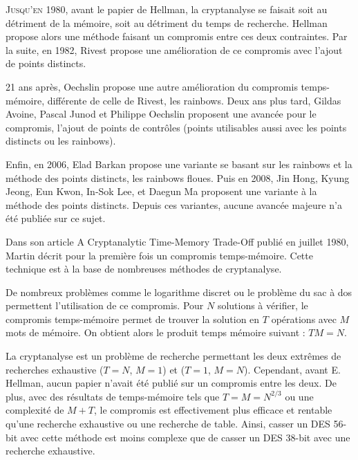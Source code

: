 

		\lettrine{J}{usqu'en 1980}, avant le papier de Hellman\cite{ehellman}, la cryptanalyse se faisait soit au détriment de la mémoire, soit au détriment du temps de recherche. Hellman propose alors une méthode faisant un compromis entre ces deux contraintes. Par la suite, en 1982, Rivest\cite{Rivest} propose une amélioration de ce compromis avec l'ajout de points distincts.

		\bigskip

		21 ans après, Oechslin\cite{Oech03} propose une autre amélioration du compromis temps-mémoire, différente de celle de Rivest, les \glspl{rainbow}. Deux ans plus tard, Gildas Avoine, Pascal Junod et Philippe Oechslin\cite{checkpoints} proposent une avancée pour le compromis, l'ajout de points de contrôles (points utilisables aussi avec les points distincts ou les \glspl{rainbow}).

		\bigskip

		Enfin, en 2006, Elad Barkan propose une variante se basant sur les \glspl{rainbow} et la méthode des points distincts\cite{fuzzy}, les \glspl{rainbow} floues. Puis en 2008, Jin Hong, Kyung Jeong, Eun Kwon, In-Sok Lee, et Daegun Ma proposent une variante à la méthode des points distincts. Depuis ces variantes, aucune avancée majeure n'a été publiée sur ce sujet.


		Dans son article \og{}A Cryptanalytic Time-Memory Trade-Off\fg{}\cite{ehellman} publié en juillet 1980, Martin  décrit pour la première fois un compromis temps-mémoire. Cette technique est à la base de nombreuses méthodes de cryptanalyse.

		\bigskip

		De nombreux problèmes comme le logarithme discret ou le problème du sac à dos permettent l'utilisation de ce compromis. Pour $N$ solutions à vérifier, le compromis temps-mémoire permet de trouver la solution en $T$ opérations avec $M$ mots de mémoire. On obtient alors le produit temps mémoire suivant : $TM = N$.

		\bigskip

		La cryptanalyse est un problème de recherche permettant les deux extrêmes de recherches exhaustive ($T=N$, $M=1$) et ($T=1$, $M=N$). Cependant, avant E. Hellman\cite{ehellman}, aucun papier n'avait été publié sur un compromis entre les deux. De plus, avec des résultats de temps-mémoire tels que $T = M = N^{2/3}$ ou une complexité de $M + T$, le compromis est effectivement plus efficace et rentable qu'une recherche exhaustive ou une recherche de table. Ainsi, casser un DES 56-bit avec cette méthode est moins complexe que de casser un DES 38-bit avec une recherche exhaustive.

